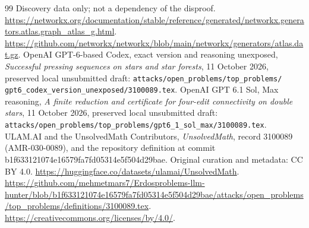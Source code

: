 \documentclass[11pt]{article}
\begin{document}
\begin{thebibliography}{99}
Discovery data only; not a dependency of the disproof.
\url{https://networkx.org/documentation/stable/reference/generated/networkx.generators.atlas.graph_atlas_g.html}.
\url{https://github.com/networkx/networkx/blob/main/networkx/generators/atlas.dat.gz}.
 OpenAI GPT-6-based Codex, exact version and reasoning
unexposed, \emph{Successful pressing sequences on stars and star forests},
11 October 2026, preserved local unsubmitted draft:
\texttt{attacks/open\_problems/top\_problems/}
\texttt{gpt6\_codex\_version\_unexposed/3100089.tex}.
 OpenAI GPT 6.1 Sol, Max reasoning,
\emph{A finite reduction and certificate for four-edit connectivity on double stars},
11 October 2026, preserved local unsubmitted draft:
\texttt{attacks/open\_problems/top\_problems/gpt6\_1\_sol\_max/3100089.tex}.
 ULAM.AI and the UnsolvedMath Contributors,
\emph{UnsolvedMath}, record 3100089 (AMR-030-0089), and the repository
definition at commit b1f633121074e16579fa7fd05314e5f504d29bae.
Original curation and metadata: CC BY 4.0.
\url{https://huggingface.co/datasets/ulamai/UnsolvedMath}.
\url{https://github.com/mehmetmars7/Erdosproblems-llm-hunter/blob/b1f633121074e16579fa7fd05314e5f504d29bae/attacks/open_problems/top_problems/definitions/3100089.tex}.
\url{https://creativecommons.org/licenses/by/4.0/}.
\end{thebibliography}
\end{document}

